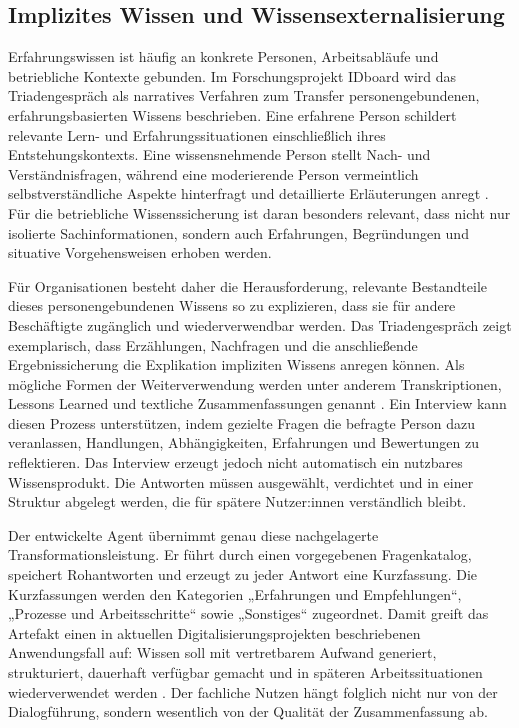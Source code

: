 \documentclass[
  10pt,
  ngerman,
  a4paper,
  toc=graduated,
  numbers=noenddot,
  headings=standardclasses,
  nonumberlist
]{scrartcl}
\begin{document}
\subsection{Implizites Wissen und Wissensexternalisierung}

Erfahrungswissen ist häufig an konkrete Personen, Arbeitsabläufe und betriebliche Kontexte gebunden. Im Forschungsprojekt IDboard wird das Triadengespräch als narratives Verfahren zum Transfer personengebundenen, erfahrungsbasierten Wissens beschrieben. Eine erfahrene Person schildert relevante Lern- und Erfahrungssituationen einschließlich ihres Entstehungskontexts. Eine wissensnehmende Person stellt Nach- und Verständnisfragen, während eine moderierende Person vermeintlich selbstverständliche Aspekte hinterfragt und detaillierte Erläuterungen anregt \cite[S.~132--135]{sander_onboarding_2023}. Für die betriebliche Wissenssicherung ist daran besonders relevant, dass nicht nur isolierte Sachinformationen, sondern auch Erfahrungen, Begründungen und situative Vorgehensweisen erhoben werden.

Für Organisationen besteht daher die Herausforderung, relevante Bestandteile dieses personengebundenen Wissens so zu explizieren, dass sie für andere Beschäftigte zugänglich und wiederverwendbar werden. Das Triadengespräch zeigt exemplarisch, dass Erzählungen, Nachfragen und die anschließende Ergebnissicherung die Explikation impliziten Wissens anregen können. Als mögliche Formen der Weiterverwendung werden unter anderem Transkriptionen, Lessons Learned und textliche Zusammenfassungen genannt \cite[S.~134--136]{sander_onboarding_2023}. Ein Interview kann diesen Prozess unterstützen, indem gezielte Fragen die befragte Person dazu veranlassen, Handlungen, Abhängigkeiten, Erfahrungen und Bewertungen zu reflektieren. Das Interview erzeugt jedoch nicht automatisch ein nutzbares Wissensprodukt. Die Antworten müssen ausgewählt, verdichtet und in einer Struktur abgelegt werden, die für spätere Nutzer:innen verständlich bleibt.

Der entwickelte Agent übernimmt genau diese nachgelagerte Transformationsleistung. Er führt durch einen vorgegebenen Fragenkatalog, speichert Rohantworten und erzeugt zu jeder Antwort eine Kurzfassung. Die Kurzfassungen werden den Kategorien „Erfahrungen und Empfehlungen“, „Prozesse und Arbeitsschritte“ sowie „Sonstiges“ zugeordnet. Damit greift das Artefakt einen in aktuellen Digitalisierungsprojekten beschriebenen Anwendungsfall auf: Wissen soll mit vertretbarem Aufwand generiert, strukturiert, dauerhaft verfügbar gemacht und in späteren Arbeitssituationen wiederverwendet werden \cite[S.~429--432, 438--440]{schweiger_serwiss_2023}. Der fachliche Nutzen hängt folglich nicht nur von der Dialogführung, sondern wesentlich von der Qualität der Zusammenfassung ab.
\end{document}
